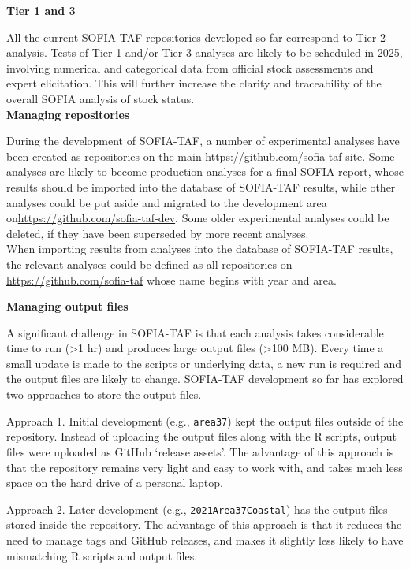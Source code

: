 \documentclass[12pt]{article}
\newcommand\blue[1]{\textcolor{darkblue}{#1}}
\newcommand\gt{\raisebox{0.1ex}\textgreater}
\begin{document}
\textbf{Tier 1 and 3}

All the current SOFIA-TAF repositories developed so far correspond to Tier 2
analysis. Tests of Tier 1 and/or Tier 3 analyses are likely to be scheduled in
2025, involving numerical and categorical data from official stock assessments
and expert elicitation. This will further increase the clarity and traceability
of the overall SOFIA analysis of stock status.\\[-2ex]

\textbf{Managing repositories}

During the development of SOFIA-TAF, a number of experimental analyses have been
created as repositories on the main \blue{\url{https://github.com/sofia-taf}}
site. Some analyses are likely to become production analyses for a final SOFIA
report, whose results should be imported into the database of SOFIA-TAF results,
while other analyses could be put aside and migrated to the development area
on\linebreak \mbox{\blue{\url{https://github.com/sofia-taf-dev}}}. Some older
experimental analyses could be deleted, if they have been superseded by more
recent analyses.\\[-2ex]

When importing results from analyses into the database of SOFIA-TAF results, the
relevant analyses could be defined as all repositories on
\blue{\url{https://github.com/sofia-taf}} whose name begins with year and area.

\textbf{Managing output files}

A significant challenge in SOFIA-TAF is that each analysis takes considerable
time to run (\gt 1 hr) and produces large output files (\gt 100 MB). Every time
a small update is made to the scripts or underlying data, a new run is required
and the output files are likely to change. SOFIA-TAF development so far has
explored two approaches to store the output files.

Approach 1. Initial development (e.g., \verb|area37|) kept the output files
outside of the repository. Instead of uploading the output files along with the
R scripts, output files were uploaded as GitHub `release assets'. The advantage
of this approach is that the repository remains very light and easy to work
with, and takes much less space on the hard drive of a personal laptop.

Approach 2. Later development (e.g., \verb|2021Area37Coastal|) has the output
files stored inside the repository. The advantage of this approach is that it
reduces the need to manage tags and GitHub releases, and makes it slightly less
likely to have mismatching R scripts and output files.
\end{document}
